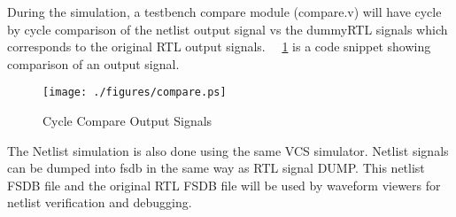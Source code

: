 During the simulation, a testbench compare module (compare.v) will have cycle by cycle comparison of the netlist output signal vs the dummyRTL signals which corresponds to the original RTL output signals. ~\figurename{~\ref{fig:compare.ps}} is a code snippet showing comparison of an output signal. 

\begin{figure}[h]
\centering
\texttt{[image: ./figures/compare.ps]}
\caption{Cycle Compare Output Signals}
\label{fig:compare.ps}
\end{figure}

The Netlist simulation is also done using the same VCS simulator. Netlist signals can be dumped into fsdb in the same way as RTL signal DUMP. This netlist FSDB file and the original RTL FSDB file will be used by waveform viewers for netlist verification and debugging.


%


